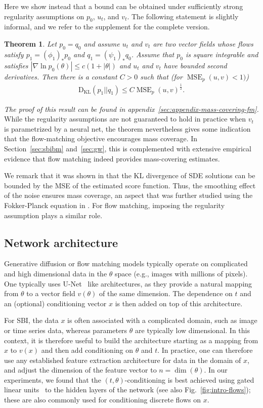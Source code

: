 \documentclass{article}
\newtheorem{theorem}{Theorem}
\theoremstyle{remark}
\newcommand{\KL}{\mathrm{D_{KL}}}
\DeclareMathOperator{\MSE}{MSE}
\begin{document}
 Here we show instead that a bound can be obtained under sufficiently strong regularity assumptions on $p_0$, $u_t$, and $v_t$. The following statement is slightly informal, and we refer to the supplement for the complete version.
 
\begin{theorem}\label{theorem:mass-coverage}
Let $p_0=q_0$ and assume $u_t$ and $v_t$ are two vector fields
whose flows satisfy $p_1=(\phi_1)_\ast p_0$
and $q_1=(\psi_1)_\ast q_0$. Assume that $p_0$ is square integrable and satisfies
$|\nabla \ln p_0(\theta)|\leq c(1+|\theta|)$ and $u_t$ and $v_t$ have bounded second derivatives. Then there is a constant $C>0$
such that (for $\MSE_p(u,v)<1)$)
\begin{align}
    \KL(p_1||q_1)\leq C \MSE_{p}(u,v)^{\frac12}.
\end{align}
\end{theorem}
\textit{The proof of this result can be found in appendix~\ref{sec:appendix-mass-covering-fm}.}
While the regularity assumptions are not guaranteed to hold in practice when $v_t$ is parametrized by a neural net, the theorem nevertheless gives some indication that the flow-matching objective encourages mass coverage. In Section~\ref{sec:sbibm} and~\ref{sec:gw}, this is complemented with extensive empirical evidence that flow matching indeed provides mass-covering estimates.

We remark that it was shown in \cite{song2021maximum} that the KL divergence of SDE solutions can be bounded by the MSE of the estimated score function. Thus, the smoothing effect of the noise ensures mass coverage, an aspect that was further studied using the Fokker-Planck equation in \cite{albergo2023stochastic}. For flow matching, imposing the regularity assumption plays a similar role.

\subsection{Network architecture}\label{subsec:fmpe-arch}
Generative diffusion or flow matching models typically operate on complicated and high dimensional data in the $\theta$ space (e.g., images with millions of pixels). One typically uses U-Net~\cite{ronneberger2015u} like architectures, as they provide a natural mapping from $\theta$ to a vector field $v(\theta)$ of the same dimension. The dependence on $t$ and an (optional) conditioning vector $x$ is then added on top of this architecture.

For SBI, the data $x$ is often associated with a complicated domain, such as image or time series data, whereas parameters $\theta$ are typically low dimensional. In this context, it is therefore useful to build the architecture starting as a mapping from $x$ to $v(x)$ and then add conditioning on $\theta$ and $t$. In practice, one can therefore use any established feature extraction architecture for data in the domain of $x$, and adjust the dimension of the feature vector to $n = \dim(\theta)$. In our experiments, we found that the $(t,\theta)$-conditioning is best achieved using gated linear units~\cite{dauphin2017language} to the hidden layers of the network (see also Fig.~\ref{fig:intro-flows}); these are also commonly used for conditioning discrete flows on $x$.
\end{document}
